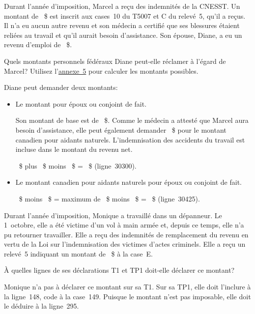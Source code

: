 \begin{question}
	Durant l'année d'imposition, Marcel a reçu des indemnités de la CNESST. Un montant de ~\$ est inscrit aux cases~10 du T5007 et C du relevé~5, qu'il a reçus. Il n'a eu aucun autre revenu et son médecin a certifié que ses blessures étaient reliées au travail et qu'il aurait besoin d'assistance. Son épouse, Diane, a eu un revenu d'emploi de ~\$.
	
	Quels montants personnels fédéraux Diane peut-elle réclamer à l'égard de Marcel? Utilisez l'\href{https://www.canada.ca/fr/agence-revenu/services/formulaires-publications/trousses-impot-toutes-annees-imposition/trousse-generale-impot-prestations/5000-s5.html}{annexe~5} pour calculer les montants possibles.
\end{question}
Diane peut demander deux montants:

\begin{itemize}
	\item Le montant pour époux ou conjoint de fait.
	
	Son montant de base est de ~\$. Comme le médecin a attesté que Marcel aura besoin d'assistance, elle peut également demander ~\$ pour le montant canadien pour aidants naturels. L'indemnisation des accidents du travail est incluse dans le montant du revenu net.
	
	~\$ plus ~\$ moins ~\$ = ~\$ (ligne~30300).
	\item Le montant canadien pour aidants naturels pour époux ou conjoint de fait.
	
	~\$ moins ~\$ = maximum de ~\$ moins ~\$ = ~\$ (ligne~30425).
\end{itemize}

\begin{question}
	Durant l'année d'imposition, Monique a travaillé dans un dépanneur. Le 1\ier{}~octobre, elle a été victime d'un vol à main armée et, depuis ce temps, elle n'a pu retourner travailler. Elle a reçu des indemnités de remplacement du revenu en vertu de la Loi sur l'indemnisation des victimes d'actes criminels. Elle a reçu un relevé~5 indiquant un montant de ~\$ à la case~E.
	
	À quelles lignes de ses déclarations T1 et TP1 doit-elle déclarer ce montant?
\end{question}
Monique n'a pas à déclarer ce montant sur sa T1. Sur sa TP1, elle doit l'inclure à la ligne~148, code  \fg{} à la case~149. Puisque le montant n'est pas imposable, elle doit le déduire à la ligne~295.

